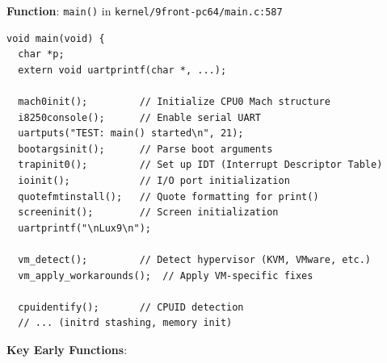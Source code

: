 \documentclass[11pt,letterpaper]{article}
\begin{document}
\textbf{Function}: \texttt{main()} in \texttt{kernel/9front-pc64/main.c:587}

\begin{lstlisting}[caption=main() entry point]
void main(void) {
  char *p;
  extern void uartprintf(char *, ...);

  mach0init();         // Initialize CPU0 Mach structure
  i8250console();      // Enable serial UART
  uartputs("TEST: main() started\n", 21);
  bootargsinit();      // Parse boot arguments
  trapinit0();         // Set up IDT (Interrupt Descriptor Table)
  ioinit();            // I/O port initialization
  quotefmtinstall();   // Quote formatting for print()
  screeninit();        // Screen initialization
  uartprintf("\nLux9\n");

  vm_detect();         // Detect hypervisor (KVM, VMware, etc.)
  vm_apply_workarounds();  // Apply VM-specific fixes

  cpuidentify();       // CPUID detection
  // ... (initrd stashing, memory init)
\end{lstlisting}

\textbf{Key Early Functions}:
\end{document}
